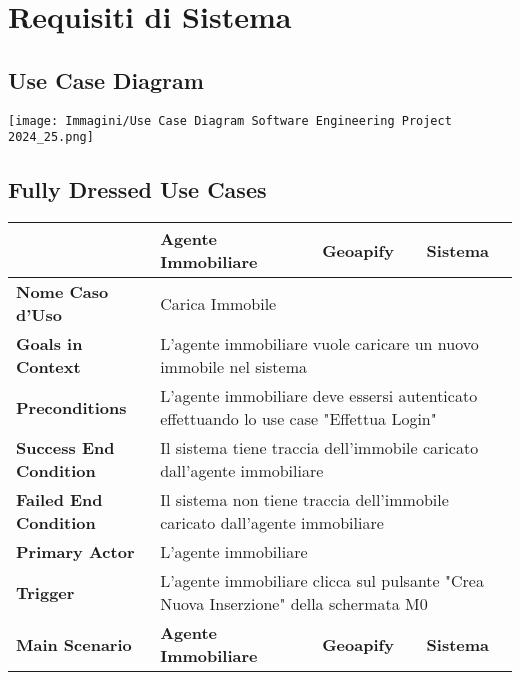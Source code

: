     \section{Requisiti di Sistema}
        \subsection{Use Case Diagram}
            \texttt{[image: Immagini/Use Case Diagram Software Engineering Project 2024\_25.png]}
        \subsection{Fully Dressed Use Cases}
    \begin{longtable}{|m{4cm}|m{4cm}|m{3cm}|m{4cm}|}
        \endfirsthead
        \hline
         & \textbf{Agente Immobiliare} & \textbf{Geoapify} & \textbf{Sistema} \\
        \hline
        \endhead %
        \hline
        \textbf{Nome Caso d'Uso} & \multicolumn{3}{p{11cm}|}{Carica Immobile} \\
        \hline
        \textbf{Goals in Context}
        & \multicolumn{3}{p{11cm}|}{L'agente immobiliare vuole caricare un nuovo immobile nel sistema} \\
        \hline
        \textbf{Preconditions}
        & \multicolumn{3}{p{11cm}|}{L'agente immobiliare deve essersi autenticato effettuando lo use case "Effettua Login"} \\
        \hline
        \textbf{Success End Condition}
        & \multicolumn{3}{p{11cm}|}{Il sistema tiene traccia dell'immobile caricato dall'agente immobiliare} \\
        \hline
        \textbf{Failed End Condition}
        & \multicolumn{3}{p{11cm}|}{Il sistema non tiene traccia dell'immobile caricato dall'agente immobiliare} \\
        \hline
        \textbf{Primary Actor}
        & \multicolumn{3}{p{11cm}|}{L'agente immobiliare} \\
        \hline
        \textbf{Trigger}
        & \multicolumn{3}{p{11cm}|}{L'agente immobiliare clicca sul pulsante "Crea Nuova Inserzione" della schermata M0} \\
        \hline

        \textbf{Main Scenario} & \textbf{Agente Immobiliare} & \textbf{Geoapify} & \textbf{Sistema} \\


\end{longtable}
